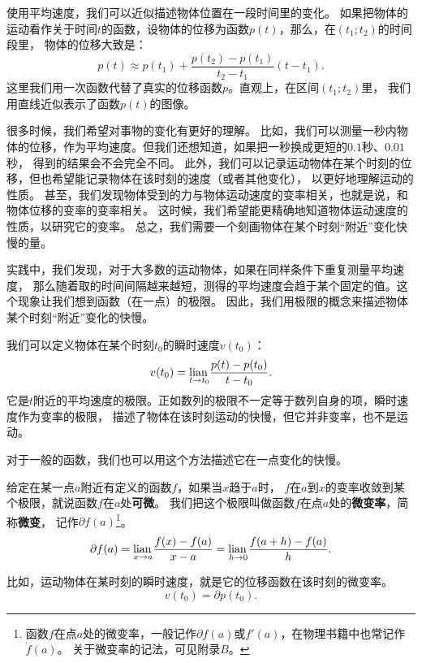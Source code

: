 \documentclass[12pt,UTF8]{ctexbook}
\begin{document}
使用平均速度，我们可以近似描述物体位置在一段时间里的变化。
如果把物体的运动看作关于时间$t$的函数，设物体的位移为函数$p(t)$，那么，在$(t_1; t_2)$的时间段里，
物体的位移大致是：
$$ p(t) \approx p(t_1) + \frac{p(t_2) - p(t_1)}{t_2 - t_1}(t - t_1).$$
这里我们用一次函数代替了真实的位移函数$p$。直观上，在区间$(t_1; t_2)$里，
我们用直线近似表示了函数$p(t)$的图像。

很多时候，我们希望对事物的变化有更好的理解。
比如，我们可以测量一秒内物体的位移，作为平均速度。但我们还想知道，如果把一秒换成更短的$0.1$秒、$0.01$秒，
得到的结果会不会完全不同。
此外，我们可以记录运动物体在某个时刻的位移，但也希望能记录物体在该时刻的速度（或者其他变化），
以更好地理解运动的性质。
甚至，我们发现物体受到的力与物体运动速度的变率相关，也就是说，和物体位移的变率的变率相关。
这时候，我们希望能更精确地知道物体运动速度的性质，以研究它的变率。
总之，我们需要一个刻画物体在某个时刻“附近”变化快慢的量。

实践中，我们发现，对于大多数的运动物体，如果在同样条件下重复测量平均速度，
那么随着取的时间间隔越来越短，测得的平均速度会趋于某个固定的值。这个现象让我们想到函数（在一点）的极限。
因此，我们用极限的概念来描述物体某个时刻“附近”变化的快慢。

我们可以定义物体在某个时刻$t_0$的瞬时速度$v(t_0)$：
$$ v(t_0) = \underset{t\to t_0}{\operatorname{lian}\,} \frac{p(t) - p(t_0)}{t - t_0}.$$
它是$t$附近的平均速度的极限。正如数列的极限不一定等于数列自身的项，瞬时速度作为变率的极限，
描述了物体在该时刻运动的快慢，但它并非变率，也不是运动。

对于一般的函数，我们也可以用这个方法描述它在一点变化的快慢。

\begin{df}\label{df:2-1-0}
    给定在某一点$a$附近有定义的函数$f$，如果当$x$趋于$a$时，
    $f$在$a$到$x$的变率收敛到某个极限，就说函数$f$在$a$处\textbf{可微}。
    我们把这个极限叫做函数$f$在点$a$处的\textbf{微变率}，简称\textbf{微变}，
    记作$\partial f(a)$\footnote{函数$f$在点$a$处的微变率，一般记作$\partial f(a)$或$f'(a)$，在物理书籍中也常记作$\dot{f}(a)$。
    关于微变率的记法，可见附录$B$。}。
    $$ \partial f(a) = \underset{x\to a}{\operatorname{lian}\,} \frac{f(x) - f(a)}{x - a} = \underset{h\to 0}{\operatorname{lian}\,} \frac{f(a + h) - f(a)}{h}.$$
\end{df}

比如，运动物体在某时刻的瞬时速度，就是它的位移函数在该时刻的微变率。
$$ v(t_0) = \partial p(t_0).$$
\end{document}
